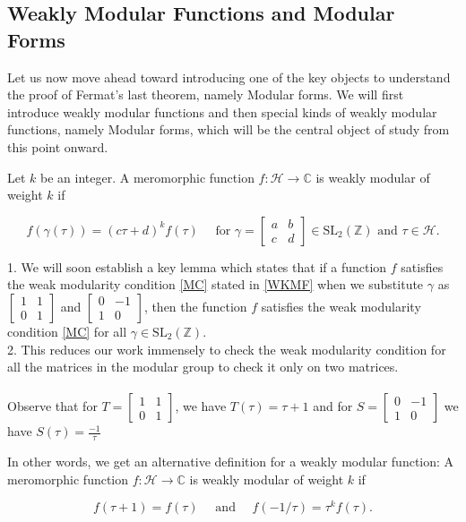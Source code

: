 \subsection{Weakly Modular Functions and Modular Forms}
Let us now move ahead toward introducing one of the key objects to understand the proof of Fermat's last theorem, namely Modular forms. We will first introduce weakly modular functions and then special kinds of weakly modular functions, namely Modular forms, which will be the central object of study from this point onward. 

\begin{definition}\label{WKMF}
     Let $k$ be an integer. A meromorphic function $f: \mathcal{H} \longrightarrow \mathbb{C}$ is weakly modular of weight $k$ if

\begin{equation}\label{MC}
f(\gamma(\tau))=(c \tau+d)^{k} f(\tau) \quad \text { for } \gamma=\left[\begin{array}{ll}
a & b \\
c & d
\end{array}\right] \in \mathrm{SL}_{2}(\mathbb{Z}) \text { and } \tau \in \mathcal{H}.    
\end{equation}
    
\end{definition}


\begin{remark}
1. We will soon establish a key lemma which states that if a function $f$ satisfies the weak modularity condition \ref{MC} stated in \ref{WKMF} when we substitute $\gamma$ as $\left[\begin{array}{ll}1 & 1 \\ 0 & 1\end{array}\right]$ and $\left[\begin{array}{rr}0 & -1 \\ 1 & 0\end{array}\right]$, then the function $f$ satisfies the weak modularity condition \ref{MC} for all $\gamma \in \mathrm{SL}_{2}(\mathbb{Z})$. \\
2. This reduces our work immensely to check the weak modularity condition for all the matrices in the modular group to check it only on two matrices. \\
\\
Observe that for $T= \left[\begin{array}{ll}1 & 1 \\ 0 & 1\end{array}\right]$, we have $T(\tau)=\tau+1$ and for $S=\left[\begin{array}{rr}0 & -1 \\ 1 & 0\end{array}\right]$ we have $S(\tau)=\frac{-1}{\tau}$
 
\bigskip 
 In other words, we get an alternative definition for a weakly modular function:  A meromorphic function $f: \mathcal{H} \longrightarrow \mathbb{C}$ is weakly modular of weight $k$ if

$$
f(\tau+1)=f(\tau) \quad \text { and } \quad f(-1 / \tau)=\tau^{k} f(\tau).
$$
\end{remark}


